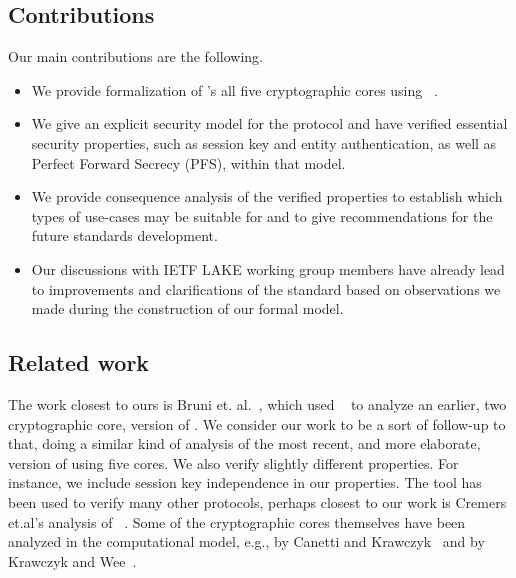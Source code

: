 \documentclass[runningheads]{llncs}
\begin{document}
\subsection{Contributions}
\label{sec:contributions}
Our main contributions are the following.
\begin{itemize}
    \item We provide formalization of \mEdhoc's all five cryptographic cores
        using \mTamarin~\cite{DBLP:conf/cav/MeierSCB13}.
    \item We give an explicit security model for the protocol and have verified
        essential security properties, such as session key and entity
        authentication, as well as Perfect Forward Secrecy (PFS), within that
        model.
    \item We provide consequence analysis of the verified properties to
        establish which types of use-cases \mEdhoc may be suitable for and
        to give recommendations for the future standards development.
    \item Our discussions with IETF LAKE working group members have already
        lead to improvements and clarifications of the standard \mSpec based on
        observations we made during the construction of our formal model.
\end{itemize}

\subsection{Related work}
\label{sec:relatedWork}
The work closest to ours is Bruni et. al.~\cite{DBLP:conf/secsr/BruniJPS18},
which used \mProverif~\cite{DBLP:conf/csfw/Blanchet01} to analyze an earlier,
two cryptographic core, version of \mEdhoc.
%
We consider our work to be a sort of follow-up to that, doing a similar kind of
analysis of the most recent, and more elaborate, version of \mEdhoc using five
cores.
%
We also verify slightly different properties.
%
For instance, we include session key independence in our properties.
%
The \mTamarin tool has been used to verify many other protocols, perhaps closest
to our work is Cremers et.al's analysis of
\mTls~\cite{DBLP:conf/ccs/CremersHHSM17}.
%
Some of the cryptographic cores themselves have been analyzed in the
computational model, e.g., \mSigma by Canetti and
Krawczyk~\cite{DBLP:conf/crypto/CanettiK02} and \mOptls by Krawczyk and
Wee~\cite{DBLP:conf/eurosp/KrawczykW16}.
%
\end{document}
